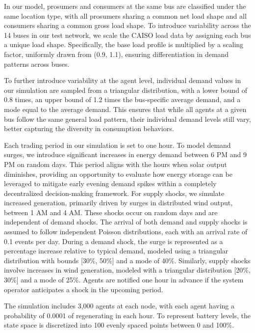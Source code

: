 \documentclass{article}
\theoremstyle{definition}
\theoremstyle{plain}
\begin{document}
In our model, prosumers and consumers at the same bus are classified under the same location type, with all prosumers sharing a common net load shape and all consumers sharing a common gross load shape. To introduce variability across the 14 buses in our test network, we scale the CAISO load data by assigning each bus a unique load shape. Specifically, the base load profile is multiplied by a scaling factor, uniformly drawn from (0.9, 1.1), ensuring differentiation in demand patterns across buses.

To further introduce variability at the agent level, individual demand values in our simulation are sampled from a triangular distribution, with a lower bound of 0.8 times, an upper bound of 1.2 times the bus-specific average demand, and a mode equal to the average demand. This ensures that while all agents at a given bus follow the same general load pattern, their individual demand levels still vary, better capturing the diversity in consumption behaviors.

Each trading period in our simulation is set to one hour. To model demand surges, we introduce significant increases in energy demand between 6 PM and 9 PM on random days. This period aligns with the hours when solar output diminishes, providing an opportunity to evaluate how energy storage can be leveraged to mitigate early evening demand spikes within a completely decentralized decision-making framework. For supply shocks, we simulate increased generation, primarily driven by surges in distributed wind output, between 1 AM and 4 AM. These shocks occur on random days and are independent of demand shocks. The arrival of both demand and supply shocks is assumed to follow independent Poisson distributions, each with an arrival rate of 0.1 events per day. During a demand shock, the surge is represented as a percentage increase relative to typical demand, modeled using a triangular distribution with bounds [30\%, 50\%] and a mode of 40\%. Similarly, supply shocks involve increases in wind generation, modeled with a triangular distribution [20\%, 30\%] and a mode of 25\%. Agents are notified one hour in advance if the system operator anticipates a shock in the upcoming period.


The simulation includes 3,000 agents at each node, with each agent having a probability of 0.0001 of regenerating in each hour. To represent battery levels, the state space is discretized into 100 evenly spaced points between 0 and 100\%. 
\end{document}
